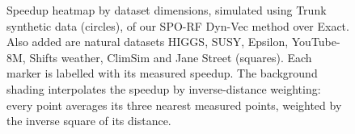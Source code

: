 \begin{figure}[t]
    \centering
    
    \caption{Speedup heatmap by dataset dimensions, simulated using Trunk synthetic data (circles), of our SPO-RF Dyn-Vec method over Exact. Also added are natural datasets HIGGS, SUSY, Epsilon, YouTube-8M, Shifts weather, ClimSim and Jane Street (squares). Each marker is labelled
    with its measured speedup. The background shading interpolates the speedup by
    inverse-distance weighting: every point averages its three nearest measured points, weighted by the inverse square
    of its distance.}
    \label{fig:rowcol-map}
\end{figure}

